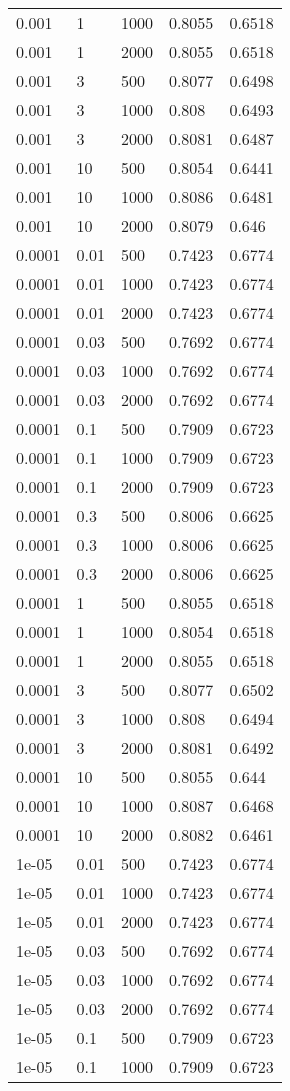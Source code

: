 \documentclass{article}%
\begin{document}
\begin{longtable}{l l l l l}
0.001&1&1000&0.8055&0.6518\\%
0.001&1&2000&0.8055&0.6518\\%
0.001&3&500&0.8077&0.6498\\%
0.001&3&1000&0.808&0.6493\\%
0.001&3&2000&0.8081&0.6487\\%
0.001&10&500&0.8054&0.6441\\%
0.001&10&1000&0.8086&0.6481\\%
0.001&10&2000&0.8079&0.646\\%
0.0001&0.01&500&0.7423&0.6774\\%
0.0001&0.01&1000&0.7423&0.6774\\%
0.0001&0.01&2000&0.7423&0.6774\\%
0.0001&0.03&500&0.7692&0.6774\\%
0.0001&0.03&1000&0.7692&0.6774\\%
0.0001&0.03&2000&0.7692&0.6774\\%
0.0001&0.1&500&0.7909&0.6723\\%
0.0001&0.1&1000&0.7909&0.6723\\%
0.0001&0.1&2000&0.7909&0.6723\\%
0.0001&0.3&500&0.8006&0.6625\\%
0.0001&0.3&1000&0.8006&0.6625\\%
0.0001&0.3&2000&0.8006&0.6625\\%
0.0001&1&500&0.8055&0.6518\\%
0.0001&1&1000&0.8054&0.6518\\%
0.0001&1&2000&0.8055&0.6518\\%
0.0001&3&500&0.8077&0.6502\\%
0.0001&3&1000&0.808&0.6494\\%
0.0001&3&2000&0.8081&0.6492\\%
0.0001&10&500&0.8055&0.644\\%
0.0001&10&1000&0.8087&0.6468\\%
0.0001&10&2000&0.8082&0.6461\\%
1e{-}05&0.01&500&0.7423&0.6774\\%
1e{-}05&0.01&1000&0.7423&0.6774\\%
1e{-}05&0.01&2000&0.7423&0.6774\\%
1e{-}05&0.03&500&0.7692&0.6774\\%
1e{-}05&0.03&1000&0.7692&0.6774\\%
1e{-}05&0.03&2000&0.7692&0.6774\\%
1e{-}05&0.1&500&0.7909&0.6723\\%
1e{-}05&0.1&1000&0.7909&0.6723\\%

\end{longtable}
\end{document}
